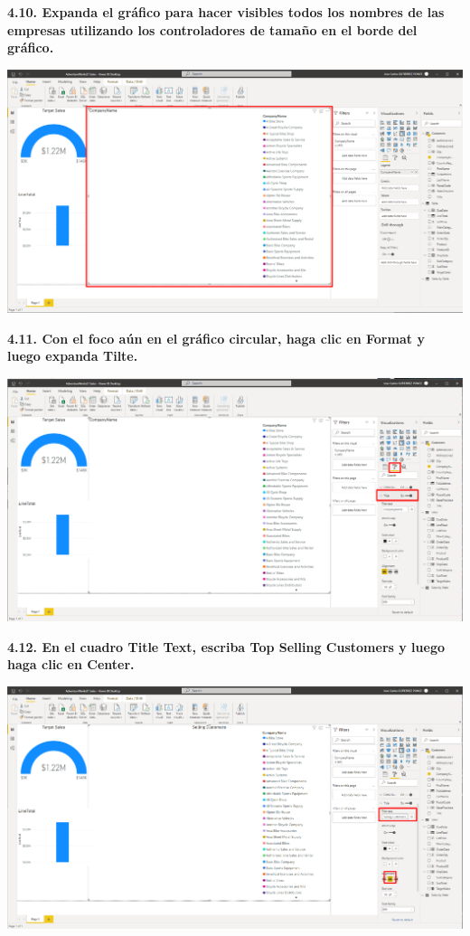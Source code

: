 \documentclass{article}
\begin{document}
\newpage
\textbf{4.10. Expanda el gráfico para hacer visibles todos los nombres de las empresas utilizando los controladores de tamaño en el borde del gráfico.}

    \begin{center}
		\includegraphics[width=14cm]{./images/86} 
	\end{center}


\textbf{4.11. Con el foco aún en el gráfico circular, haga clic en \textbf{Format} y luego expanda \textbf{Tilte}.}

    \begin{center}
		\includegraphics[width=14cm]{./images/87} 
	\end{center}

\newpage
\textbf{4.12. En el cuadro \textbf{Title Text}, escriba Top \textbf{Selling Customers} y luego haga clic en \textbf{Center}.}

    \begin{center}
		\includegraphics[width=14cm]{./images/88} 
	\end{center}
\end{document}
